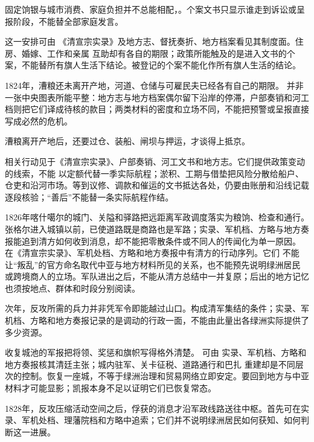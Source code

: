 固定饷银与城市消费、家庭负担并不总能相配，。个案文书只显示谁走到诉讼或呈报阶段，不能替全部家庭发言。

这一安排可由
《清宣宗实录》及地方志、督抚奏折、地方档案看见其制度面。住房、婚嫁、工作和亲属
互助却有各自的期限；政策所能触及的是进入文书的个案，不能替所有旗人生活下结论。被登记的个案不能化作所有旗人生活的结论。

1824年，漕粮还未离开产地，河道、仓储与可雇民夫已经各有自己的期限。
并非一张中央图表所能平整：地方志与地方档案偶尔留下沿岸的停滞，户部奏销和河工档则把它们译成待核的款目；两类材料的密度和立场不同，不能把预警或呈报直接写成必然的危机。

漕粮离开产地后，还要过仓、装船、闸坝与押运，才谈得上抵京。

相关行动见于《清宣宗实录》、户部奏销、河工文书和地方志。它们提供政策变动的线索，不能
以定额代替一季实际航程；淤积、工期与借垫把风险分散给船户、仓吏和沿河市场。等到议修、调款和催运的文书抵达各处，仍要由账册和沿线记载逐段核验；“善后”不能替一条实际航程作结。

1826年喀什噶尔的城门、关隘和驿路把远距离军政调度落实为粮饷、检查和通行。张格尔进入城镇以前，已使道路既是商路也是军路；实录、军机档、方略与地方奏报能追到清方如何收到消息，却不能把零散条件或不同人的传闻化为单一原因。
在《清宣宗实录》、军机处档、方略和地方奏报中有清方的行动序列。它们
不能让“叛乱”的官方命名取代中亚与地方材料所见的关系，也不能预先说明绿洲居民
或跨境商人的立场。军队进出之后，不能从清方总结中一并复原；后出的地方记忆也须按地点、群体和时段分别阅读。

次年，反攻所需的兵力并非凭军令即能越过山口。构成清军集结的条件；实录、军机档、方略和地方奏报记录的是调动的行政一面，不能由此量出各绿洲实际提供了多少资源。

收复城池的军报把将领、奖惩和旗帜写得格外清楚。
可由
实录、军机档、方略和地方奏报核其清廷主张；城内驻军、关卡征税、道路通行和巴扎
重建却是不同层次的控制。恢复一座城，不等于绿洲治理和贸易网络立即安定。要回到地方与中亚材料才可能显影；凯报本身不足以证明它们已恢复常态。

1828年，反攻压缩活动空间之后，俘获的消息才沿军政线路送往中枢。首先可在实录、军机处档、理藩院档和方略中追索；它们并不说明绿洲居民如何获知、如何判断这一进展。

